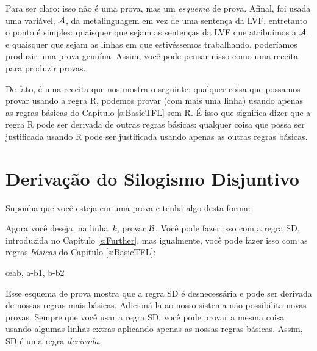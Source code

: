 Para ser claro: isso não é uma prova, mas um \emph{esquema} de prova. Afinal, foi usada  uma variável, $\mathcal{A}$, da metalinguagem  em vez de uma sentença da LVF, entretanto o ponto é simples: quaisquer que sejam as sentenças da LVF que atribuímos a $\mathcal{A}$, e quaisquer que sejam as linhas em que estivéssemos trabalhando, poderíamos produzir uma  prova genuína. Assim, você pode pensar nisso como uma receita para produzir provas.

De fato, é uma receita que nos mostra o seguinte: qualquer coisa que possamos provar usando a regra R, podemos provar (com mais uma linha) usando apenas as regras básicas do Capítulo \ref{s:BasicTFL} sem R. É isso que significa dizer que a regra R pode ser derivada de outras regras básicas: qualquer coisa que possa ser justificada usando R pode ser justificada usando apenas as outras regras básicas.

\section{Derivação do Silogismo Disjuntivo}
Suponha que você esteja em uma prova e tenha algo desta forma:
\begin{fitchproof}
\end{fitchproof}
Agora você deseja, na linha~$k$, provar $\mathcal{B}$. Você pode fazer isso com a regra SD, introduzida no Capítulo \ref{s:Further}, mas igualmente, você pode fazer isso com as regras  \emph{básicas} do Capítulo \ref{s:BasicTFL}:
 

	\begin{fitchproof}
		\open
		\close
		\open
		\close
	\oe{ab, a-b1, b-b2}
\end{fitchproof}
Esse esquema de prova mostra que a regra SD é desnecessária e pode ser derivada de nossas regras mais básicas. Adicioná-la ao nosso sistema não possibilita novas provas. Sempre  que você usar a regra SD, você pode provar a mesma coisa usando algumas linhas extras aplicando apenas as nossas regras básicas. Assim, SD é uma regra \emph{derivada}.

